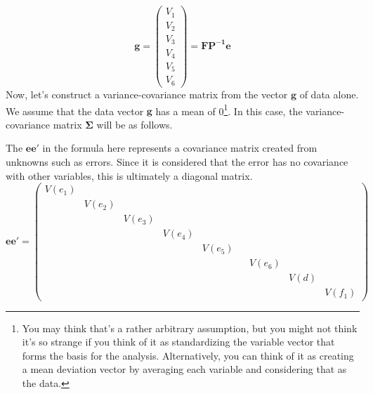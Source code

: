 \documentclass{ltjsbook}
\begin{document}
\[
	\bm{g} = \begin{pmatrix}  V_1 \\ V_2 \\ V_3 \\ V_4 \\ V_5 \\ V_6 \end{pmatrix} = \bm{FP^{-1}e}
\]
Now, let's construct a variance-covariance matrix from the vector $\bm{g}$ of data alone. We assume that the data vector $\bm{g}$ has a mean of 0\footnote{You may think that's a rather arbitrary assumption, but you might not think it's so strange if you think of it as standardizing the variable vector that forms the basis for the analysis. Alternatively, you can think of it as creating a mean deviation vector by averaging each variable and considering that as the data.}. In this case, the variance-covariance matrix $\bm{\Sigma}$ will be as follows.



The $\bm{ee'}$ in the formula here represents a covariance matrix created from unknowns such as errors. Since it is considered that the error has no covariance with other variables, this is ultimately a diagonal matrix.
\[
	\bm{ee'}= \begin{pmatrix}  V(e_1) &        &        &        &        &  &        &      &        \\
                        & V(e_2) &        &        &        &  &        &      &        \\
                        &        & V(e_3) &        &        &  &        &      &        \\
                        &        &        & V(e_4) &        &  &        &      &        \\
                        &        &        &        & V(e_5) &  &        &      &        \\
                        &        &        &        &        &  & V(e_6) &      &        \\
                        &        &        &        &        &  &        & V(d) &        \\
                        &        &        &        &        &  &        &      & V(f_1)\end{pmatrix}
\]
\end{document}
